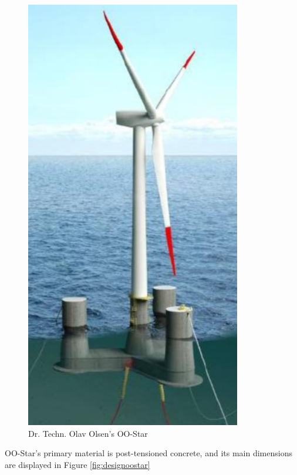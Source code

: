 \begin{figure}[H]
\centering
\includegraphics[scale=0.6]{figures/oostar}
\caption[$\; \:$Dr. Techn. Olav Olsen's OO-Star]{Dr. Techn. Olav Olsen's OO-Star \cite{Lifes50+D4.2} }
 \label{fig:oostar}
\end{figure}

\noindent OO-Star's primary material is post-tensioned concrete, and its main dimensions are displayed in Figure \ref{fig:designoostar}

